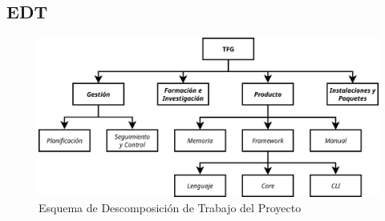 













\subsection{EDT}\label{subsec:edt}

\begin{figure}[H]
    \centering
    \includegraphics[width=0.85\linewidth]{5-Cuerpo/Chapter2/EDT.png}
    \caption[EDT del Proyecto]{Esquema de Descomposición de Trabajo del Proyecto}\label{fig:EDT}
\end{figure}

